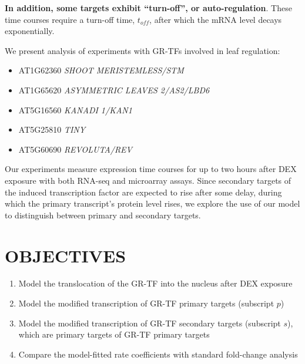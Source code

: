 \documentclass[aspb,landscape]{a0poster}
\begin{document}
\begin{multicols}{3}
{    \textbf{In addition, some targets exhibit ``turn-off'', or auto-regulation}. These time courses require a turn-off time, $t_{off}$, after which the mRNA level decays exponentially.
    
    We present analysis of experiments with GR-TFs involved in leaf regulation:
    \begin{itemize}
    \item AT1G62360 \textit{SHOOT MERISTEMLESS/STM}
    \item AT1G65620 \textit{ASYMMETRIC LEAVES 2/AS2/LBD6}
    \item AT5G16560 \textit{KANADI 1/KAN1}
    \item AT5G25810 \textit{TINY}
    \item AT5G60690 \textit{REVOLUTA/REV}
    \end{itemize}
    
    Our experiments measure expression time courses for up to two hours after DEX exposure with both RNA-seq and microarray assays.
    Since secondary targets of the induced transcription factor are expected to rise after some delay, during which the primary transcript's protein level rises,
    we explore the use of our model to distinguish between primary and secondary targets.

  }


  \section*{OBJECTIVES}
  \color{CarnegiePriBlue}  

  {
    \begin{enumerate}
    \item Model the translocation of the GR-TF into the nucleus after DEX exposure
    \item Model the modified transcription of GR-TF primary targets (subscript $p$)
    \item Model the modified transcription of GR-TF secondary targets (subscript $s$), which are primary targets of GR-TF primary targets
    \item Compare the model-fitted rate coefficients with standard fold-change analysis
    \end{enumerate}
  }


\end{multicols}
\end{document}
